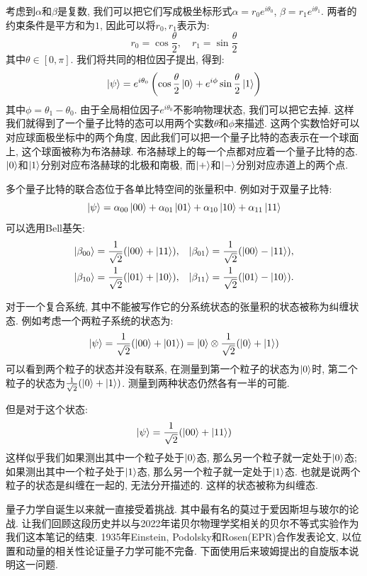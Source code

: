 考虑到$\alpha$和$\beta$是复数, 我们可以把它们写成极坐标形式$\alpha = r_0 e^{i\theta_0}$, $\beta = r_1 e^{i\theta_1}$. 两者的约束条件是平方和为$1$, 因此可以将$r_0,r_1$表示为:
\[
r_0 = \cos\frac{\theta}{2}, \quad r_1 = \sin\frac{\theta}{2}
\]
其中$\theta \in [0, \pi]$. 我们将共同的相位因子提出, 得到:
\[
\ket{\psi} = e^{i\theta_0} \left( \cos\frac{\theta}{2}\ket{0} + e^{i\phi}\sin\frac{\theta}{2}\ket{1} \right)
\]
其中$\phi = \theta_1 - \theta_0$. 由于全局相位因子$e^{i\theta_0}$不影响物理状态, 我们可以把它去掉. 这样我们就得到了一个量子比特的态可以用两个实数$\theta$和$\phi$来描述. 这两个实数恰好可以对应球面极坐标中的两个角度, 因此我们可以把一个量子比特的态表示在一个球面上, 这个球面被称为布洛赫球. 布洛赫球上的每一个点都对应着一个量子比特的态. $\ket{0}$和$\ket{1}$分别对应布洛赫球的北极和南极, 而$\ket{+}$和$\ket{-}$分别对应赤道上的两个点.


多个量子比特的联合态位于各单比特空间的张量积中. 例如对于双量子比特:
\[
\ket\psi = \alpha_{00}\ket{00} + \alpha_{01}\ket{01} + \alpha_{10}\ket{10} + \alpha_{11}\ket{11}
\]
可以选用Bell基矢:
\[
\begin{aligned}
\ket{\beta_{00}} &= \frac{1}{\sqrt{2}}(\ket{00} + \ket{11}), &
\ket{\beta_{01}} &= \frac{1}{\sqrt{2}}(\ket{00} - \ket{11}), \\
\ket{\beta_{10}} &= \frac{1}{\sqrt{2}}(\ket{01} + \ket{10}), &
\ket{\beta_{11}} &= \frac{1}{\sqrt{2}}(\ket{01} - \ket{10}).
\end{aligned}
\]

对于一个复合系统, 其中不能被写作它的分系统状态的张量积的状态被称为纠缠状态. 例如考虑一个两粒子系统的状态为:
\[
\ket{\psi} = \frac{1}{\sqrt{2}}(\ket{00} + \ket{01}) = \ket{0} \otimes \frac{1}{\sqrt{2}}(\ket{0} + \ket{1})
\]
可以看到两个粒子的状态并没有联系, 在测量到第一个粒子的状态为$\ket{0}$时, 第二个粒子的状态为$\frac{1}{\sqrt{2}}(\ket{0} + \ket{1})$. 测量到两种状态仍然各有一半的可能.

但是对于这个状态:
\[
\ket{\psi} = \frac{1}{\sqrt{2}}(\ket{00} + \ket{11})
\]
这样似乎我们如果测出其中一个粒子处于$\ket{0}$态, 那么另一个粒子就一定处于$\ket{0}$态; 如果测出其中一个粒子处于$\ket{1}$态, 那么另一个粒子就一定处于$\ket{1}$态. 也就是说两个粒子的状态是纠缠在一起的, 无法分开描述的. 这样的状态被称为纠缠态.

量子力学自诞生以来就一直接受着挑战. 其中最有名的莫过于爱因斯坦与玻尔的论战. 让我们回顾这段历史并以与2022年诺贝尔物理学奖相关的贝尔不等式实验作为我们这本笔记的结束. 1935年Einstein, Podolsky和Rosen(EPR)合作发表论文, 以位置和动量的相关性论证量子力学可能不完备. 下面使用后来玻姆提出的自旋版本说明这一问题.

